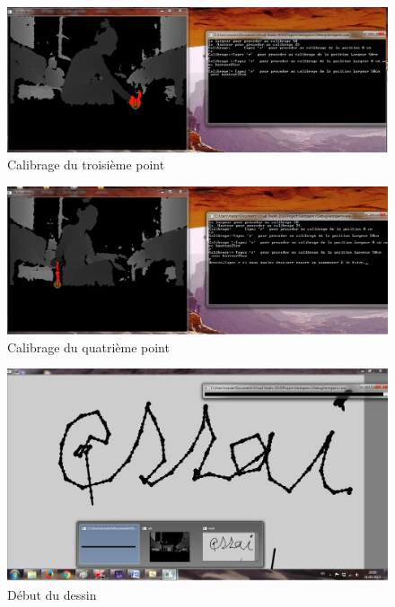 \documentclass[12pt,a4paper,oneside]{book}
\begin{document}
	\begin{figure}[H]
		\centering
		\includegraphics[scale=0.47]{images/it6.png}
		\caption{Calibrage du troisième point}
		\label{fig16}
		
	\end{figure}
	
	\begin{figure}[H]
		\centering
		\includegraphics[scale=0.47]{images/it7.png}
		\caption{Calibrage du quatrième point}
		\label{fig17}
		
	\end{figure}
	
	
	\begin{figure}[H]
		\centering
		\includegraphics[scale=0.47]{images/it5.png}
		\caption{Début du dessin}
		\label{fig12}
		
	\end{figure}
	
\end{document}
